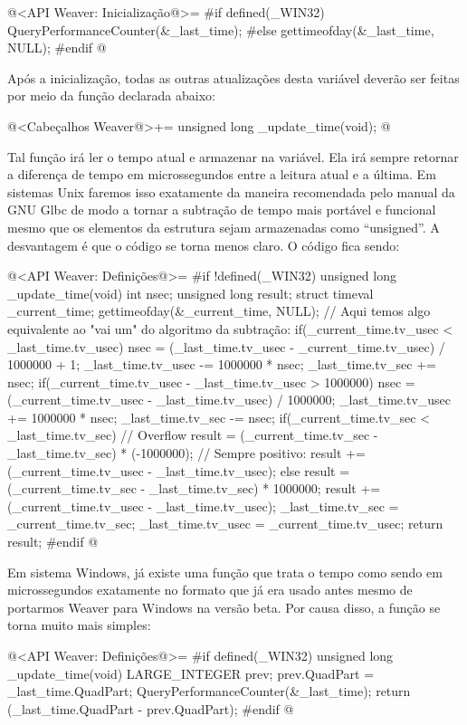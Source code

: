 \iniciocodigo
@<API Weaver: Inicialização@>=
#if defined(_WIN32)
QueryPerformanceCounter(&_last_time);
#else
gettimeofday(&_last_time, NULL);
#endif
@
\fimcodigo

Após a inicialização, todas as outras atualizações desta variável
deverão ser feitas por meio da função declarada abaixo:

\iniciocodigo
@<Cabeçalhos Weaver@>+=
unsigned long _update_time(void);
@
\fimcodigo

Tal função irá ler o tempo atual e armazenar na variável. Ela irá
sempre retornar a diferença de tempo em microssegundos entre a leitura
atual e a última. Em sistemas Unix faremos isso exatamente da maneira
recomendada pelo manual da GNU Glbc de modo a tornar a subtração de
tempo mais portável e funcional mesmo que os elementos da
estrutura  sejam armazenadas como ``unsigned''.  A
desvantagem é que o código se torna menos claro. O código fica sendo:

\iniciocodigo
@<API Weaver: Definições@>=
#if !defined(_WIN32)
unsigned long _update_time(void){
  int nsec;
  unsigned long result;
  struct timeval _current_time;
  gettimeofday(&_current_time, NULL);
  // Aqui temos algo equivalente ao "vai um" do algoritmo da subtração:
  if(_current_time.tv_usec < _last_time.tv_usec){
    nsec = (_last_time.tv_usec - _current_time.tv_usec) / 1000000 + 1;
    _last_time.tv_usec -= 1000000 * nsec;
    _last_time.tv_sec += nsec;
  }
  if(_current_time.tv_usec - _last_time.tv_usec > 1000000){
    nsec = (_current_time.tv_usec - _last_time.tv_usec) / 1000000;
    _last_time.tv_usec += 1000000 * nsec;
    _last_time.tv_sec -= nsec;
  }
  if(_current_time.tv_sec < _last_time.tv_sec){
    // Overflow
    result = (_current_time.tv_sec - _last_time.tv_sec) * (-1000000);
    // Sempre positivo:
    result += (_current_time.tv_usec - _last_time.tv_usec);
  }
  else{
    result = (_current_time.tv_sec - _last_time.tv_sec) * 1000000;
    result += (_current_time.tv_usec - _last_time.tv_usec);
  }
  _last_time.tv_sec = _current_time.tv_sec;
  _last_time.tv_usec = _current_time.tv_usec;
  return result;
}
#endif
@
\fimcodigo

Em sistema Windows, já existe uma função que trata o tempo como sendo
em microssegundos exatamente no formato que já era usado antes mesmo
de portarmos Weaver para Windows na versão beta. Por causa disso, a
função se torna muito mais simples:

\iniciocodigo
@<API Weaver: Definições@>=
#if defined(_WIN32)
unsigned long _update_time(void){
  LARGE_INTEGER prev;
  prev.QuadPart = _last_time.QuadPart;
  QueryPerformanceCounter(&_last_time);
  return (_last_time.QuadPart - prev.QuadPart);
}
#endif
@
\fimcodigo

